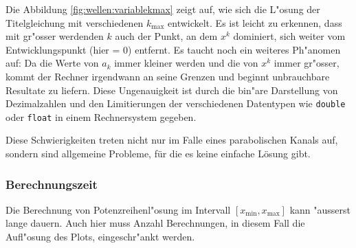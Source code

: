 Die Abbildung \ref{fig:wellen:variablekmax} zeigt auf, wie sich die L"osung 
der Titelgleichung mit verschiedenen $k_{\text{max}}$ entwickelt. Es ist leicht 
zu erkennen, dass mit gr"osser werdenden $k$ auch der Punkt, an dem $x^k$ 
dominiert, sich weiter vom Entwicklungspunkt (hier = 0) entfernt. Es taucht 
noch ein weiteres Ph"anomen auf: Da die Werte von $a_k$ immer kleiner werden 
und die von $x^k$ immer gr"osser, kommt der Rechner irgendwann an seine Grenzen 
und beginnt unbrauchbare Resultate zu liefern. Diese Ungenauigkeit ist durch 
die bin"are Darstellung von Dezimalzahlen und den Limitierungen der 
verschiedenen Datentypen wie \texttt{double} oder \texttt{float} in einem 
Rechnersystem gegeben.

Diese Schwierigkeiten treten nicht nur im Falle eines parabolischen Kanals 
auf, sondern sind allgemeine Probleme, für die es keine einfache Lösung gibt.

\subsubsection{Berechnungszeit}
Die Berechnung von Potenzreihenl"osung im Intervall
$[x_{\text{min}},x_{\text{max}}]$ kann "ausserst lange dauern. Auch hier muss 
Anzahl Berechnungen, in diesem Fall die Aufl"osung des Plots, eingeschr"ankt 
werden. 



